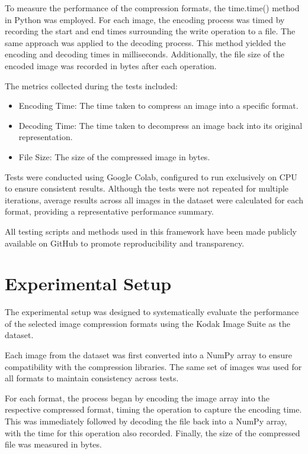 \documentclass[conference]{IEEEtran}
\begin{document}
To measure the performance of the compression formats, the time.time() method in Python was employed. For each image, the encoding process was timed by recording the start and end times surrounding the write operation to a file. The same approach was applied to the decoding process. This method yielded the encoding and decoding times in milliseconds. Additionally, the file size of the encoded image was recorded in bytes after each operation.


The metrics collected during the tests included:
\begin{itemize}
    \item Encoding Time: The time taken to compress an image into a specific format.
    \item Decoding Time: The time taken to decompress an image back into its original representation.
    \item File Size: The size of the compressed image in bytes.
\end{itemize}

Tests were conducted using Google Colab, configured to run exclusively on CPU to ensure consistent results. Although the tests were not repeated for multiple iterations, average results across all images in the dataset were calculated for each format, providing a representative performance summary.

All testing scripts and methods used in this framework have been made publicly available on GitHub\cite{github_repo} to promote reproducibility and transparency.

\section{Experimental Setup}
The experimental setup was designed to systematically evaluate the performance of the selected image compression formats using the Kodak Image Suite as the dataset.

Each image from the dataset was first converted into a NumPy array to ensure compatibility with the compression libraries. The same set of images was used for all formats to maintain consistency across tests.

For each format, the process began by encoding the image array into the respective compressed format, timing the operation to capture the encoding time. This was immediately followed by decoding the file back into a NumPy array, with the time for this operation also recorded. Finally, the size of the compressed file was measured in bytes.
\end{document}
